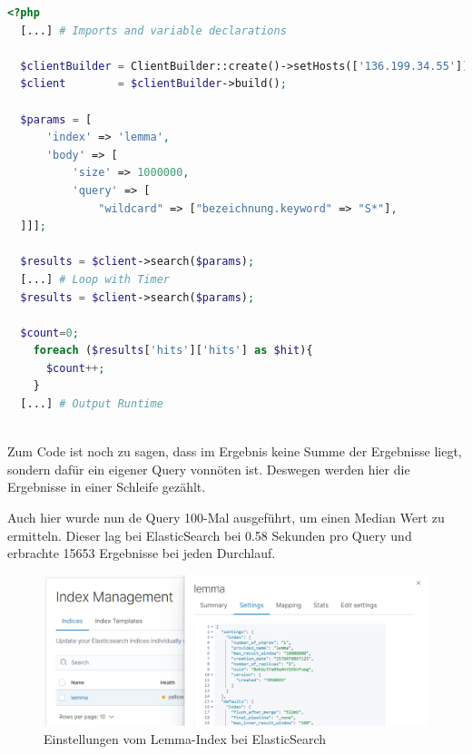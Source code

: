 \begin{lstlisting}[language=php, frame=single, label={lst:phpElastic}, 
  morekeywords={type,uninvertible,indexed,stored,field,multiValued, name}] 
  <?php
  [...] # Imports and variable declarations

  $clientBuilder = ClientBuilder::create()->setHosts(['136.199.34.55']);
  $client        = $clientBuilder->build();

  $params = [
      'index' => 'lemma',
      'body' => [
          'size' => 1000000,
          'query' => [
              "wildcard" => ["bezeichnung.keyword" => "S*"],
  ]]];
  
  $results = $client->search($params);
  [...] # Loop with Timer  
  $results = $client->search($params);

  $count=0;
    foreach ($results['hits']['hits'] as $hit){
      $count++;
    }
  [...] # Output Runtime
  
\end{lstlisting}

Zum Code ist noch zu sagen, dass im Ergebnis keine Summe der Ergebnisse liegt, sondern dafür ein eigener Query vonnöten ist. Deswegen werden hier die Ergebnisse in einer Schleife gezählt.

Auch hier wurde nun de Query 100-Mal ausgeführt, um einen Median Wert zu ermitteln. Dieser lag bei ElasticSearch bei 0.58 Sekunden pro Query und erbrachte 15653 Ergebnisse bei jeden Durchlauf.

\begin{figure}
	\centering
	\includegraphics[width=1\linewidth]{images/elastic_index_settings.png}
	\caption{Einstellungen vom Lemma-Index bei ElasticSearch}
	\label{img:elasticIndexSettings}
\end{figure}


